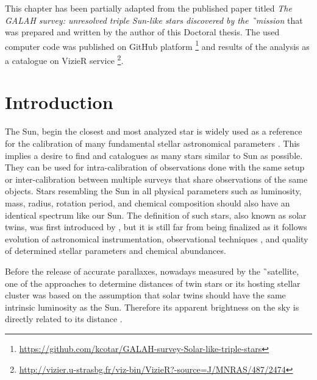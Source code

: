 This chapter has been partially adapted from the published paper titled \textit{The GALAH survey: unresolved triple Sun-like stars discovered by the \G\ mission} \citep{2019MNRAS.487.2474C} that was prepared and written by the author of this Doctoral thesis. The used computer code was published on GitHub platform  \footnote{\url{https://github.com/kcotar/GALAH-survey-Solar-like-triple-stars}} and results of the analysis as a catalogue on VizieR service  \footnote{\url{http://vizier.u-strasbg.fr/viz-bin/VizieR?-source=J/MNRAS/487/2474}}.


\section{Introduction}
The Sun, begin the closest and most analyzed star is widely used as a reference for the calibration of many fundamental stellar astronomical parameters \cite{2010A&A...522A..98M, 2012MNRAS.426..484D}. This implies a desire to find and catalogues as many stars similar to Sun as possible. They can be used for intra-calibration of observations done with the same setup or inter-calibration between multiple surveys that share observations of the same objects. Stars resembling the Sun in all physical parameters such as luminosity, mass, radius, rotation period, and chemical composition should also have an identical spectrum like our Sun. The definition of such stars, also known as solar twins, was first introduced by \citet{1981A&A....94....1C}, but it is still far from being finalized as it follows evolution of astronomical instrumentation, observational techniques \cite{2017AN....338..442A}, and quality of determined stellar parameters and chemical abundances.

Before the release of accurate parallaxes, nowadays measured by the \G\ satellite, one of the approaches to determine distances of twin stars or its hosting stellar cluster was based on the assumption that solar twins should have the same intrinsic luminosity as the Sun. Therefore its apparent brightness on the sky is directly related to its distance \cite{2015MNRAS.453.1428J, 2016A&A...595A..59M, 2017MNRAS.472.2517J}.


